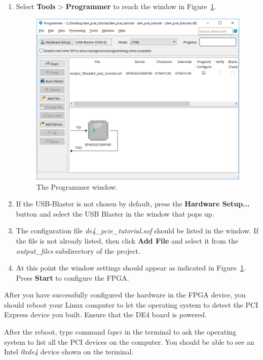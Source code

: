 \documentclass[11pt, twoside, pdftex]{article}
\begin{document}
\begin{enumerate}
	\item Select {\bf Tools} > {\bf Programmer} to reach the window in Figure~\ref{fig:project_program}.
	
\begin{figure}%
	\centering
		\includegraphics[scale=0.65]{figures/project_program.png}%
	\caption{The Programmer window.}%
	\label{fig:project_program}%
\end{figure}
	
	\item If the USB-Blaster is not chosen by default, press the {\bf Hardware Setup...} button and select the USB Blaster in the window that pops up.
	\item The configuration file {\it de4\_pcie\_tutorial.sof} should be listed in the window. If the file is not already listed, then click {\bf Add File} and select it from the {\it output\_files} subdirectory of the project. 
	\item At this point the window settings should appear as indicated in Figure~\ref{fig:project_program}. Press {\bf Start} to configure the FPGA.
	
\end{enumerate}

After you have successfully configured the hardware in the FPGA device, you should reboot your Linux computer to let the operating system to detect the PCI Express device you built. Ensure that the DE4 board is powered.

After the reboot, type command $lspci$ in the terminal to ask the operating system to list all the PCI devices on the computer. You should be able to see an Intel {\it 0xde4} device shown on the terminal.
\end{document}

